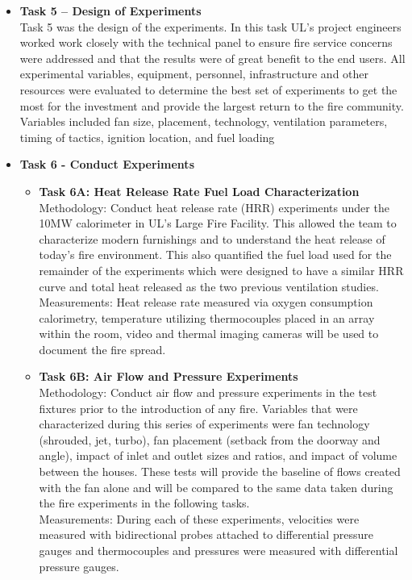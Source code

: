 \documentclass{article}
\begin{document}
\begin{itemize}
	\item \textbf{Task 5 – Design of Experiments} \\
	Task 5 was the design of the experiments. In this task UL’s project engineers worked work closely with the technical panel to ensure fire service concerns were addressed and that the results were of great benefit to the end users. All experimental variables, equipment, personnel, infrastructure and other resources were evaluated to determine the best set of experiments to get the most for the investment and provide the largest return to the fire community. Variables included fan size, placement, technology, ventilation parameters, timing of tactics, ignition location, and fuel loading
	
	\item \textbf{Task 6 - Conduct Experiments} \\
	\begin{itemize}
		\item \textbf{Task 6A: Heat Release Rate Fuel Load Characterization} \\
		Methodology: Conduct heat release rate (HRR) experiments under the 10MW calorimeter in UL’s Large Fire Facility. This allowed the team to characterize modern furnishings and to understand the heat release of today’s fire environment. This also quantified the fuel load used for the remainder of the experiments which were designed to have a similar HRR curve and total heat released as the two previous ventilation studies.
		\\
		Measurements: Heat release rate measured via oxygen consumption calorimetry, temperature utilizing thermocouples placed in an array within the room, video and thermal imaging cameras will be used to document the fire spread.
		
		\item \textbf{Task 6B: Air Flow and Pressure Experiments} \\
		Methodology: Conduct air flow and pressure experiments in the test fixtures prior to the introduction of any fire. Variables that were characterized during this series of experiments were fan technology (shrouded, jet, turbo), fan placement (setback from the doorway and angle), impact of inlet and outlet sizes and ratios, and impact of volume between the houses. These tests will provide the baseline of flows created with the fan alone and will be compared to the same data taken during the fire experiments in the following tasks.
		\\
		Measurements: During each of these experiments, velocities were measured with bidirectional probes attached to differential pressure gauges and thermocouples and pressures were measured with differential pressure gauges.
		

\end{itemize}
\end{itemize}
\end{document}
